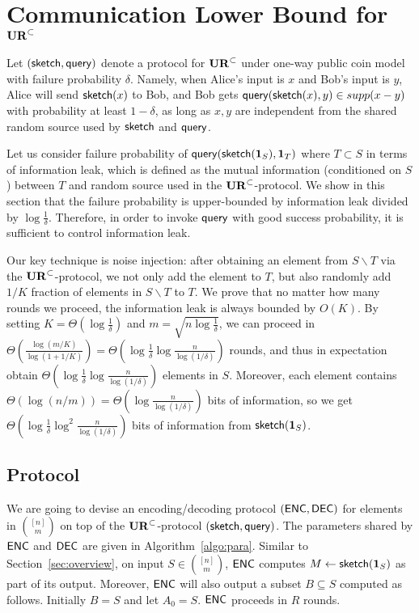 \section{Communication Lower Bound for $\mathbf{UR}^\subset$} \label{sec:optimal-lb}


Let $(\mathsf{sketch}, \mathsf{query})$ denote a protocol for $\mathbf{UR}^\subset$ under one-way public coin model with failure probability $\delta$.
Namely, when Alice's input is $x$ and Bob's input is $y$, Alice will send $\mathsf{sketch}(x)$ to Bob, and Bob gets $\mathsf{query}(\mathsf{sketch}(x), y)\in supp(x-y)$ with probability at least $1-\delta$, as long as $x,y$ are independent from the shared random source used by $\mathsf{sketch}$ and $\mathsf{query}$. 

Let us consider failure probability of $\mathsf{query}(\mathsf{sketch}(\mathbf{1}_S), \mathbf{1}_T)$ where $T\subset S$ in terms of information leak, which is defined as the mutual information (conditioned on $S$) between $T$ and random source used in the $\mathbf{UR}^\subset$-protocol. 
We show in this section that the failure probability is upper-bounded by information leak divided by $\log \frac{1}{\delta}$. 
Therefore, in order to invoke $\mathsf{query}$ with good success probability, it is sufficient to control information leak.

Our key technique is noise injection: after obtaining an element from $S\backslash T$ via the $\mathbf{UR}^\subset$-protocol, we not only add the element to $T$, but also randomly add $1/K$ fraction of elements in $S\backslash T$ to $T$. 
We prove that no matter how many rounds we proceed, the information leak is always bounded by $O(K)$. 
By setting $K=\Theta(\log \frac{1}{\delta})$ and $m=\sqrt{n\log\frac{1}{\delta}}$, we can proceed in $\Theta(\frac{\log (m/K)}{\log (1 +1/K)}) = \Theta(\log\frac{1}{\delta}\log\frac{n}{\log(1/\delta)})$ rounds, and thus in expectation obtain $\Theta(\log\frac{1}{\delta}\log\frac{n}{\log(1/\delta)})$ elements in $S$.
Moreover, each element contains $\Theta(\log(n/m))=\Theta(\log \frac{n}{\log (1/\delta)})$ bits of information, so we get $\Theta(\log \frac{1}{\delta}\log^2 \frac{n}{\log (1/\delta)}) $ bits of information from $\mathsf{sketch}(\mathbf{1}_S)$. 

\subsection{Protocol}
We are going to devise an encoding/decoding protocol $(\textsf{ENC}, \textsf{DEC})$ for elements in ${[n] \choose m}$ on top of the $\mathbf{UR}^\subset$-protocol $(\mathsf{sketch}, \mathsf{query})$.
The parameters shared by $\textsf{ENC}$ and $\textsf{DEC}$ are given in Algorithm~\ref{algo:para}.
Similar to Section~\ref{sec:overview}, on input $S\in {[n] \choose m}$, $\textsf{ENC}$ computes $M \leftarrow \mathsf{sketch}(\mathbf{1}_S)$ as part of its output. 
Moreover, $\textsf{ENC}$ will also output a subset $B\subseteq S$ computed as follows.
Initially $B=S$ and let $A_0=S$. $\textsf{ENC}$ proceeds in $R$ rounds. 

